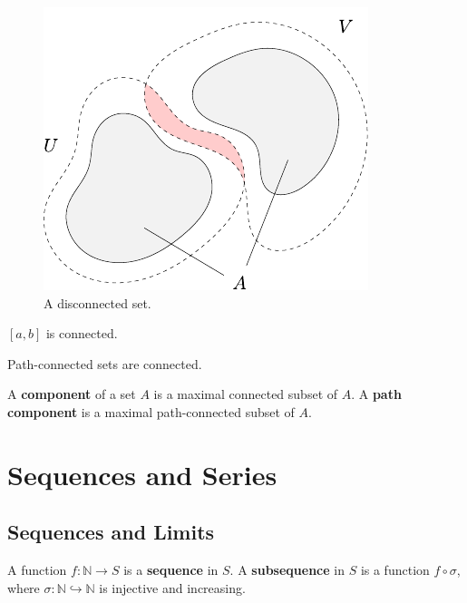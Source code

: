 \documentclass[twoside,10pt]{report}
\begin{document}
\begin{figure}[H]
	\centering
	\includegraphics[scale=1]{fig/disconnected.pdf}
	\caption{A disconnected set.}
\end{figure}

\begin{prop}
	$[a,b]$ is connected.
\end{prop}

\begin{thrm}[]
Path-connected sets are connected.
\end{thrm}

\begin{defn}[]
	A \textbf{component} of a set $A$ is a maximal connected subset of $A$. A \textbf{path component} is a maximal path-connected subset of $A$.
\end{defn}


\chapter{Sequences and Series}


\section{Sequences and Limits}

\begin{defn}[]
	A function $f:\mathbb{N} \to S$ is a \textbf{sequence} in $S$. A \textbf{subsequence} in $S$ is a function $f \circ \sigma$, where $\sigma:\mathbb{N}\hookrightarrow \mathbb{N}$ is injective and increasing.
\end{defn}
\end{document}
